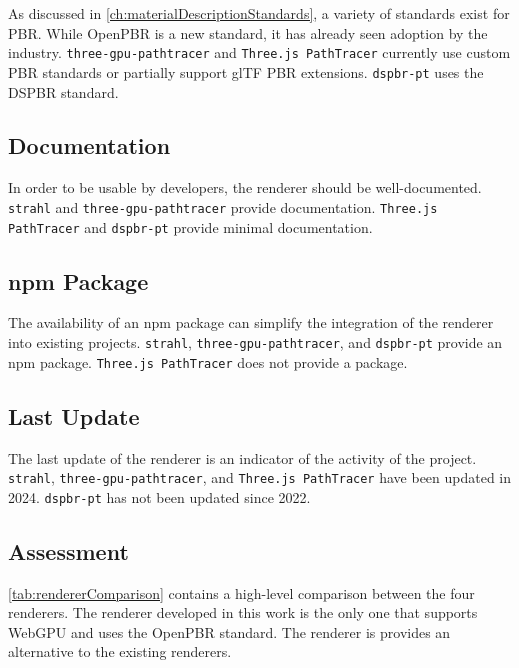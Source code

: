 As discussed in \autoref{ch:materialDescriptionStandards}, a variety of standards exist for \gls{PBR}. While \gls{OpenPBR} is a new standard, it has already seen adoption by the industry. \texttt{three-gpu-pathtracer} and \texttt{Three.js PathTracer} currently use custom \gls{PBR} standards or partially support \gls{glTF} PBR extensions. \texttt{dspbr-pt} uses the \gls{DSPBR} standard.

\subsection*{Documentation}

In order to be usable by developers, the renderer should be well-documented. \texttt{strahl} and \texttt{three-gpu-pathtracer} provide documentation. \texttt{Three.js PathTracer} and \texttt{dspbr-pt} provide minimal documentation.

\subsection*{npm Package}

The availability of an \gls{npm} package can simplify the integration of the renderer into existing projects. \texttt{strahl}, \texttt{three-gpu-pathtracer}, and \texttt{dspbr-pt} provide an \gls{npm} package. \texttt{Three.js PathTracer} does not provide a package.

\subsection*{Last Update}

The last update of the renderer is an indicator of the activity of the project. \texttt{strahl}, \texttt{three-gpu-pathtracer}, and \texttt{Three.js PathTracer} have been updated in 2024. \texttt{dspbr-pt} has not been updated since 2022.

\subsection*{Assessment}
\autoref{tab:rendererComparison} contains a high-level comparison between the four renderers. The renderer developed in this work is the only one that supports \gls{WebGPU} and uses the \gls{OpenPBR} standard. The renderer is provides an alternative to the existing renderers.

